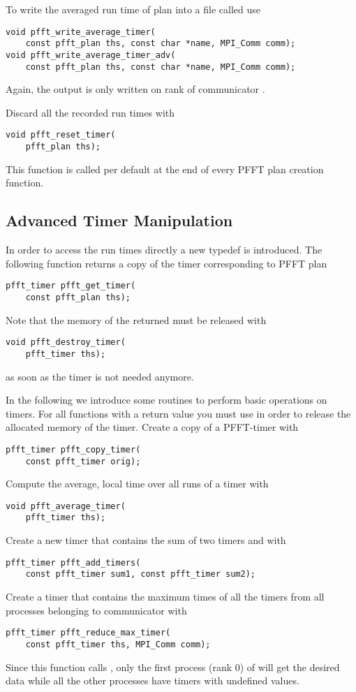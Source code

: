 To write the averaged run time of plan  into a file called  use
\begin{lstlisting}
void pfft_write_average_timer(
    const pfft_plan ths, const char *name, MPI_Comm comm);
void pfft_write_average_timer_adv(
    const pfft_plan ths, const char *name, MPI_Comm comm);
\end{lstlisting}
Again, the output is only written on rank  of communicator .

Discard all the recorded run times with
\begin{lstlisting}
void pfft_reset_timer(
    pfft_plan ths);
\end{lstlisting}
This function is called per default at the end of every PFFT plan creation function.

\subsection{Advanced Timer Manipulation}
In order to access the run times directly a new typedef  is introduced.
The following function returns a copy of the timer corresponding to PFFT plan 
\begin{lstlisting}
pfft_timer pfft_get_timer(
    const pfft_plan ths);
\end{lstlisting}
Note that the memory of the returned  must be released with
\begin{lstlisting}
void pfft_destroy_timer(
    pfft_timer ths);
\end{lstlisting}
as soon as the timer is not needed anymore. 

In the following we introduce some routines to perform basic operations on timers.
For all functions with a  return value you must use 
in order to release the allocated memory of the timer.
Create a copy of a PFFT-timer  with
\begin{lstlisting}
pfft_timer pfft_copy_timer(
    const pfft_timer orig);
\end{lstlisting}
Compute the average, local time over all runs of a timer  with
\begin{lstlisting}
void pfft_average_timer(
    pfft_timer ths);
\end{lstlisting}
Create a new timer that contains the sum of two timers  and  with
\begin{lstlisting}
pfft_timer pfft_add_timers(
    const pfft_timer sum1, const pfft_timer sum2);
\end{lstlisting}
Create a timer that contains the maximum times of all the timers  from all processes belonging to communicator  with
\begin{lstlisting}
pfft_timer pfft_reduce_max_timer(
    const pfft_timer ths, MPI_Comm comm);
\end{lstlisting}
Since this function calls , only the first process (rank 0) of  will get the desired data while all
the other processes have timers with undefined values.

